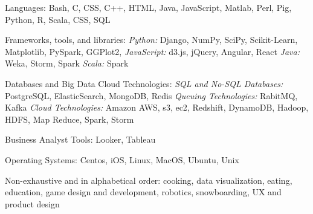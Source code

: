 \documentclass[10pt,a4paper]{article}
\begin{document}
\vspace{0.5em}
\inlineheadsection
  {Languages:}
  {Bash, C, CSS, C++, HTML, Java, JavaScript, Matlab, Perl, Pig, Python, R, Scala, CSS, SQL}

\vspace{0.5em}
\inlineheadsection
  {Frameworks, tools, and libraries:}
  {
    \textit{Python:} Django, NumPy, SciPy, Scikit-Learn, Matplotlib, PySpark, GGPlot2,
    \textit{JavaScript:} d3.js, jQuery, Angular, React
    \textit{Java:} Weka, Storm, Spark
    \textit{Scala:} Spark
  }

\vspace{0.5em}
\inlineheadsection
  {Databases and Big Data Cloud Technologies:}
  {
    \textit{SQL and No-SQL Databases:} PostgreSQL, ElasticSearch, MongoDB, Redis
    \textit{Queuing Technologies:} RabitMQ, Kafka
    \textit{Cloud Technologies:} Amazon AWS, s3, ec2, Redshift, DynamoDB, Hadoop, HDFS, Map Reduce, Spark, Storm
  }

\vspace{0.5em}
\inlineheadsection
  {Business Analyst Tools:}
  {Looker, Tableau}

\vspace{0.5em}
\inlineheadsection
  {Operating Systems:}
  {Centos, iOS, Linux, MacOS, Ubuntu, Unix}





\spacedhrule{1.6em}{-0.4em}


\inlineheadsection
  {Non-exhaustive and in alphabetical order:}
  {cooking, data visualization, eating, education, game design and development, robotics, snowboarding, UX and product design}
\end{document}
